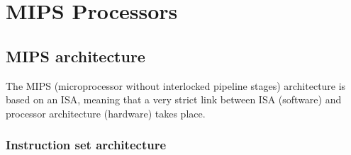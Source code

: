 \chapter{MIPS Processors}


\section {MIPS architecture}
The MIPS (microprocessor without interlocked pipeline stages) architecture is
based on an ISA, meaning that a very strict link between ISA (software) and
processor architecture (hardware) takes place.


\subsection{Instruction set architecture}

